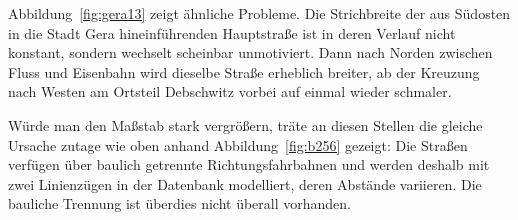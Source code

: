 \documentclass[../main/thesis.tex]{subfiles}
\begin{document}

Abbildung~\ref{fig:gera13} zeigt ähnliche Probleme.
Die Strichbreite der aus Südosten in die Stadt Gera hineinführenden Hauptstraße ist in deren Verlauf nicht konstant, sondern wechselt scheinbar unmotiviert.
Dann nach Norden zwischen Fluss und Eisenbahn wird dieselbe Straße erheblich breiter, ab der Kreuzung nach Westen am Ortsteil Debschwitz vorbei auf einmal wieder schmaler.

Würde man den Maßstab stark vergrößern, träte an diesen Stellen die gleiche Ursache zutage wie oben anhand Abbildung~\ref{fig:b256}
gezeigt: Die Straßen verfügen über baulich getrennte Richtungsfahrbahnen und werden deshalb mit zwei Linienzügen in der Datenbank modelliert, deren Abstände variieren.
Die bauliche Trennung ist überdies nicht überall vorhanden.

\end{document}

